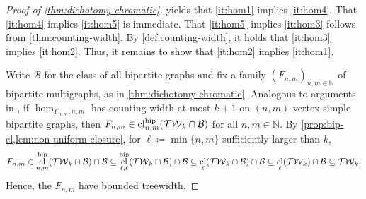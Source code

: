 \documentclass[10pt,a4paper]{article}
\theoremstyle{definition}
\theoremstyle{plain}
\theoremstyle{remark}
\newcommand{\Bb}{{\cal B}}
\newcommand{\Cc}{{\cal C}}
\DeclareMathOperator{\tw}{tw}
\DeclareMathOperator{\cl}{cl}
\newcommand{\bbN}{\mathbb{N}}
\begin{document}
	\begin{proof}[Proof of \cref{thm:dichotomy-chromatic}]
		 yields that \ref{it:hom1} implies \ref{it:hom4}.
		That \ref{it:hom4} implies \ref{it:hom5} is immediate.
		That \ref{it:hom5} implies \ref{it:hom3} follows from \cref{thm:counting-width}.
		By \cref{def:counting-width},
		it holds that \ref{it:hom3} implies \ref{it:hom2}.
		Thus, it remains to show that \ref{it:hom2} implies \ref{it:hom1}.
		
		Write $\mathcal{B}$ for the class of all bipartite graphs and fix a family $(F_{n,m})_{n,m \in \bbN}$ of bipartite multigraphs, as in \cref{thm:dichotomy-chromatic}.
		Analogous to arguments in \cite{dvorak_recognizing_2010},
		if $\hom_{F_{n,m}, n,m}$ has counting width at most $k+1$  on $(n,m)$-vertex simple bipartite graphs,
		then $F_{n,m} \in \cl^{\textup{bip}}_{n,m}(\mathcal{TW}_k \cap \mathcal{B})$ for all $n,m \in \bbN$.
		By \cref{prop:bip-cl,lem:non-uniform-closure},
		for $\ell \coloneqq \min\{n,m\}$ sufficiently larger than $k$,
		\[
			F_{n,m} 
			\in \cl^{\textup{bip}}_{n,m}(\mathcal{TW}_k \cap \mathcal{B}) \cap \mathcal{B}
			\subseteq \cl^{\textup{bip}}_{\ell,\ell}(\mathcal{TW}_k \cap \mathcal{B})  \cap \mathcal{B}
			\subseteq \cl_\ell(\mathcal{TW}_k \cap \mathcal{B})  \cap \mathcal{B}
			\subseteq \cl_\ell(\mathcal{TW}_k) \cap \mathcal{B}
			\subseteq \mathcal{TW}_k.
		\]
		Hence, the $F_{n,m}$ have bounded treewidth.

\end{proof}
\end{document}

